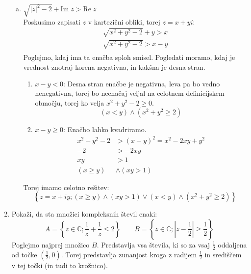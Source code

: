 \documentclass[12pt,a4paper,slovene]{article}
\begin{document}
\begin{enumerate}[(1)]
\begin{enumerate}[(a)]
        \item $\sqrt{|z|^2 - 2} + \text{Im}\;z > \text{Re}\;z$\\
        Poskusimo zapisati $z$ v kartezični obliki, torej $z = x + yi$:
        \begin{align*}
            \sqrt{x^2 + y^2 - 2} + y > x\\
            \sqrt{x^2 + y^2 - 2} > x - y\\
        \end{align*}
        Poglejmo, kdaj ima ta enačba sploh smisel. Pogledati moramo, kdaj je vrednost znotraj korena negativna, in kakšna je desna stran.
        \begin{enumerate}
            \item $x - y < 0$: Desna stran enačbe je negativna, leva pa bo vedno nenegativna, torej bo neenačaj veljal na celotnem definicijskem območju, torej ko velja $x^2 + y^2 - 2 \geq 0$.
            \[
            (x < y) \land (x^2 + y^2 \geq 2)
            \]
            \item $x - y \geq 0$: Enačbo lahko kvadriramo.
            \begin{align*}
                x^2 + y^2 - 2 &> (x - y)^2 = x^2 - 2xy +  y^2\\
                -2 &> -2xy\\
                xy &> 1\\
                (x \geq y) &\land (xy > 1)
            \end{align*}
        \end{enumerate}
        Torej imamo celotno rešitev:
        \[
        \left\{ z = x+ iy; (x \geq y) \land (xy > 1) \lor (x < y) \land (x^2 + y^2 \geq 2) \right\}
        \]
    \end{enumerate}

    \item Pokaži, da sta množici kompleksnih števil enaki:
    \[
    A = \left\{ z \in \mathbb{C}; \frac{1}{z} + \frac{1}{\overline{z}} \leq 2  \right\} 
    \qquad
    B = \left\{ z \in \mathbb{C}; \left|z - \frac{1}{2} \right| \geq \frac{1}{2} \right\}    
    \]
    Poglejmo najprej množico $B$. Predstavlja vsa števila, ki so za vsaj $\frac{1}{2}$ oddaljena od točke $\left( \frac{1}{2}, 0 \right)$. Torej predstavlja zunanjost kroga z radijem $\frac{1}{2}$ in središčem v tej točki (in tudi to krožnico).
    

\end{enumerate}
\end{document}

